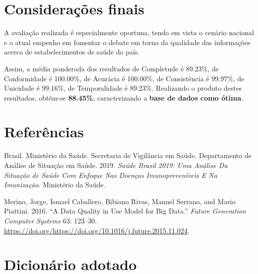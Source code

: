 \documentclass[
  12,
]{proadi}
\begin{document}
\hypertarget{considerauxe7uxf5es-finais}{%
\section{Considerações finais}\label{considerauxe7uxf5es-finais}}

A avaliação realizada é especialmente oportuna, tendo em vista o cenário
nacional e o atual empenho em fomentar o debate em torno da qualidade
das informações acerca de estabelecimentos de saúde do país.

Assim, a média ponderada dos resultados de Completude é 89.23\%, de
Conformidade é 100.00\%, de Acurácia é 100.00\%, de Consistência é
99.97\%, de Unicidade é 99.16\%, de Temporalidade é 89.23\%. Realizando
o produto destes resultados, obtêm-se \textbf{88.45\%}, caracterizando a
\textbf{base de dados como ótima}.

\newpage

\hypertarget{referuxeancias}{%
\section{Referências}\label{referuxeancias}}

\hypertarget{refs}{}
\leavevmode\hypertarget{ref-brasil2019}{}%
Brasil. Ministério da Saúde. Secretaria de Vigilância em Saúde.
Departamento de Análise de Situação em Saúde. 2019. \emph{Saúde Brasil
2019: Uma Análise Da Situação de Saúde Com Enfoque Nas Doenças
Imunopreveníveis E Na Imunização}. Ministério da Saúde.

\leavevmode\hypertarget{ref-merino}{}%
Merino, Jorge, Ismael Caballero, Bibiano Rivas, Manuel Serrano, and
Mario Piattini. 2016. ``A Data Quality in Use Model for Big Data.''
\emph{Future Generation Computer Systems} 63: 123--30.
\url{https://doi.org/https://doi.org/10.1016/j.future.2015.11.024}.

\captionsetup[table]{labelformat=empty}

\newpage

\hypertarget{dicionuxe1rio-adotado}{%
\section*{Dicionário adotado}\label{dicionuxe1rio-adotado}}

\begingroup\fontsize{10}{12}\selectfont
\end{document}
